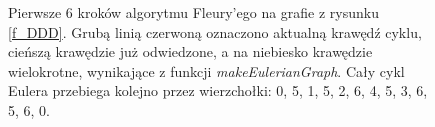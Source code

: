 \documentclass[a4paper, 12pt, twoside, openright]{article}
\begin{document}
\begin{figure}[!p]
		\quad
		
		\caption[]{Pierwsze 6 kroków algorytmu Fleury'ego na grafie z rysunku \ref{f_DDD}. Grubą linią czerwoną oznaczono aktualną krawędź cyklu, cieńszą krawędzie już odwiedzone, a na niebiesko krawędzie wielokrotne, wynikające z funkcji \textit{makeEulerianGraph}. Cały cykl Eulera przebiega kolejno przez wierzchołki: 0, 5, 1, 5, 2, 6, 4, 5, 3, 6, 5, 6, 0.}
		\label{imgFluAlgoEgz1}
	\end{figure}	
	
\end{document}
